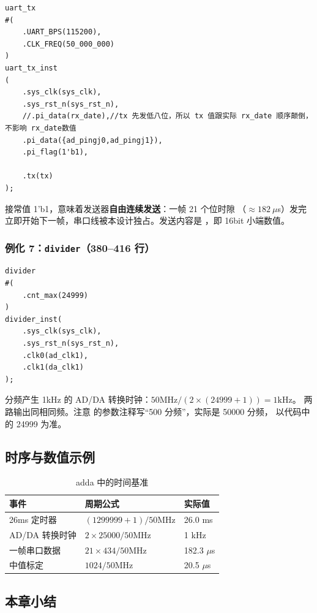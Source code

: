 \begin{lstlisting}[style=vsnip]
uart_tx
#(
    .UART_BPS(115200),
    .CLK_FREQ(50_000_000)
)
uart_tx_inst
(
    .sys_clk(sys_clk),
    .sys_rst_n(sys_rst_n),
    //.pi_data(rx_date),//tx 先发低八位，所以 tx 值跟实际 rx_date 顺序颠倒，不影响 rx_date数值
    .pi_data({ad_pingj0,ad_pingj1}),
    .pi_flag(1'b1),

    .tx(tx)
);
\end{lstlisting}

 接常值 1'b1，意味着发送器\textbf{自由连续发送}：一帧 21 个位时隙
（$\approx182\ \mu$s）发完立即开始下一帧，串口线被本设计独占。发送内容是
，即 16bit 小端数值。

\subsubsection{例化 7：\texttt{divider}（380--416 行）}

\begin{lstlisting}[style=vsnip]
divider
#(
    .cnt_max(24999)
)
divider_inst(
    .sys_clk(sys_clk),
    .sys_rst_n(sys_rst_n),
    .clk0(ad_clk1),
    .clk1(da_clk1)
);
\end{lstlisting}

分频产生 1kHz 的 AD/DA 转换时钟：$50\text{MHz}/(2\times(24999+1))=1\text{kHz}$。
两路输出同相同频。注意  的参数注释写“500 分频”，实际是 50000 分频，
以代码中的 24999 为准。

\subsection{时序与数值示例}

\begin{table}[htbp]
\centering
\small
\caption{adda 中的时间基准}
\begin{tabular}{lll}
\toprule
事件 & 周期公式 & 实际值\\
\midrule
26ms 定时器 & $(1299999+1)/50\text{MHz}$ & 26.0 ms\\
AD/DA 转换时钟 & $2\times25000/50\text{MHz}$ & 1 kHz\\
一帧串口数据 & $21\times434/50\text{MHz}$ & 182.3 $\mu$s\\
中值标定 & $1024/50\text{MHz}$ & 20.5 $\mu$s\\
\bottomrule
\end{tabular}
\end{table}

\subsection{本章小结}


